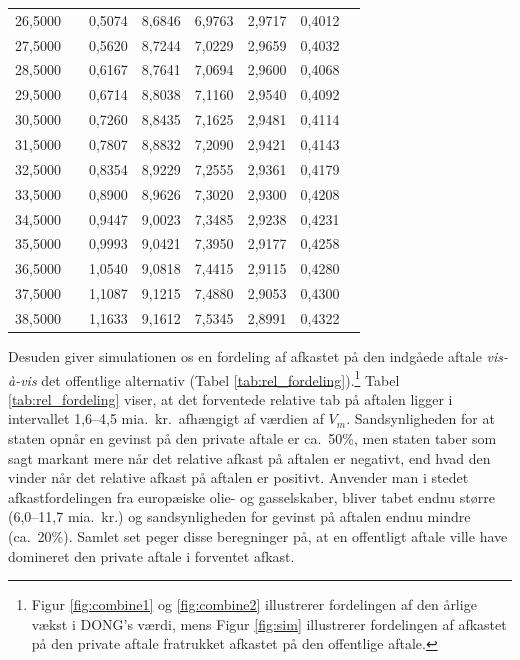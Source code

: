 \documentclass{article}
\begin{document}
\begin{table}[h]
\begin{center}
\begin{tabular}{cXcccccr}
 26{,}5000&&0{,}5074&8{,}6846&6{,}9763&2{,}9717&0{,}4012\\
 27{,}5000&&0{,}5620&8{,}7244&7{,}0229&2{,}9659&0{,}4032\\
 28{,}5000&&0{,}6167&8{,}7641&7{,}0694&2{,}9600&0{,}4068\\
 29{,}5000&&0{,}6714&8{,}8038&7{,}1160&2{,}9540&0{,}4092\\
 30{,}5000&&0{,}7260&8{,}8435&7{,}1625&2{,}9481&0{,}4114\\
 31{,}5000&&0{,}7807&8{,}8832&7{,}2090&2{,}9421&0{,}4143\\
 32{,}5000&&0{,}8354&8{,}9229&7{,}2555&2{,}9361&0{,}4179\\
 33{,}5000&&0{,}8900&8{,}9626&7{,}3020&2{,}9300&0{,}4208\\
 34{,}5000&&0{,}9447&9{,}0023&7{,}3485&2{,}9238&0{,}4231\\
 35{,}5000&&0{,}9993&9{,}0421&7{,}3950&2{,}9177&0{,}4258\\
 36{,}5000&&1{,}0540&9{,}0818&7{,}4415&2{,}9115&0{,}4280\\
 37{,}5000&&1{,}1087&9{,}1215&7{,}4880&2{,}9053&0{,}4300\\
 38{,}5000&&1{,}1633&9{,}1612&7{,}5345&2{,}8991&0{,}4322\\

\bottomrule[1pt]
	\end{tabular}
\end{center}
\end{table}

Desuden giver simulationen os en fordeling af afkastet på den indgåede aftale \emph{vis-\`{a}-vis} det offentlige alternativ (Tabel \ref{tab:rel_fordeling}).\footnote{Figur \ref{fig:combine1} og \ref{fig:combine2} illustrerer fordelingen af den årlige vækst i DONG's værdi, mens Figur \ref{fig:sim} illustrerer fordelingen af afkastet på den private aftale fratrukket afkastet på den offentlige aftale.} Tabel \ref{tab:rel_fordeling} viser, at det forventede relative tab på aftalen ligger i intervallet 1,6--4,5 mia.\ kr.\ afhængigt af værdien af $V_m$. Sandsynligheden for at staten opnår en gevinst på den private aftale er ca.\ 50\%, men staten taber som sagt markant mere når det relative afkast på aftalen er negativt, end hvad den vinder når det relative afkast på aftalen er positivt. Anvender man i stedet afkastfordelingen fra europæiske olie- og gasselskaber, bliver tabet endnu større (6,0--11,7 mia.\ kr.) og sandsynligheden for gevinst på aftalen endnu mindre (ca.\ 20\%). Samlet set peger disse beregninger på, at en offentligt aftale ville have domineret den private aftale i forventet afkast.
\end{document}

